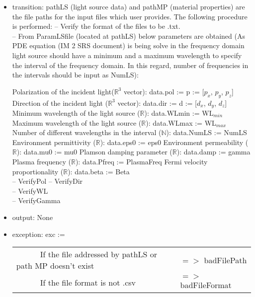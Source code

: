 \documentclass[12pt, titlepage]{article}
\begin{document}
	\begin{itemize} \item transition: pathLS (light source data) and pathMP
		(material properties) are the file paths for the input files which user
		provides. The following procedure is performed: \subitem -- Verify the format of
		the files to be .txt.\\ \subitem -- From ParamLSfile (located at pathLS) below
		parameters are obtained (As PDE equation (IM 2 SRS document) is being solve in
		the frequency domain light source should have a minimum and a maximum wavelength
		to specify the interval of the frequency domain. In this regard, number of
		frequencies in the intervals should be input as NumLS):
		
		\subsubitem Polarization of the incident light($\mathbb{R}^3$ vector): data.pol
		:= p := [$p_x$, $p_y$, $p_z$]
		\subsubitem Direction of the incident light ($\mathbb{R}^3$ vector): data.dir
		:= d := [$d_x$, $d_y$, $d_z$]
		\subsubitem Minimum wavelength of the light source ($\mathbb{R}$): data.WLmin
		:= WL$_{min}$
		\subsubitem Maximum wavelength of the light source ($\mathbb{R}$): data.WLmax
		:= WL$_{max}$
		\subsubitem Number of different wavelengths in the interval ($\mathbb{N}$):
		data.NumLS := NumLS
		\subsubitem Environment permittivity ($\mathbb{R}$): data.eps0 := eps0
		\subsubitem Environment permeability ($\mathbb{R}$): data.mu0 := mu0
		\subsubitem Plamson damping parameter ($\mathbb{R}$): data.damp := gamma
		\subsubitem Plasma frequency ($\mathbb{R}$): data.Pfreq := PlasmaFreq
		\subsubitem Fermi velocity proportionality ($\mathbb{R}$): data.beta := Beta\\
		\subitem -- VerifyPol
		\subitem -- VerifyDir\\ 
		\subitem -- VerifyWL\\
		\subitem -- VerifyGamma\\ 
		
		\item output: None
		
		\item exception: exc :=\  \noindent \begin{longtable*}[l]{l l} \ \ \ \ \ \ If the file
			addressed by pathLS or path MP doesn't exist & $=>$ badFilePath\\ \ \ \ \ \ \
			If the file format is not .csv & $=>$ badFileFormat\\ \end{longtable*}
		
	\end{itemize}
	
\end{document}
